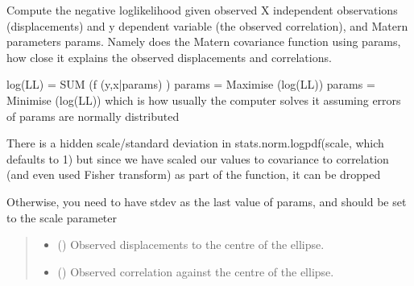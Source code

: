 \documentclass[letterpaper,10pt,english]{sphinxmanual}
\begin{document}
\begin{fulllineitems}
\begin{fulllineitems}
\end{fulllineitems}


\begin{fulllineitems}
\label{\detokenize{ellipse:glomar_gridding.ellipse.EllipseModel.negative_log_likelihood}}
\pysigstartsignatures
\pysiglinewithargsret
{}
{\sphinxparamcomma {}\sphinxparamcomma {}\sphinxparamcomma {}}
{}
\pysigstopsignatures
\sphinxAtStartPar
Compute the negative log\sphinxhyphen{}likelihood given observed X independent
observations (displacements) and y dependent variable (the observed
correlation), and Matern parameters params. Namely does the Matern
covariance function using params, how close it explains the observed
displacements and correlations.

\sphinxAtStartPar
log(LL) = SUM (f (y,x|params) )
params = Maximise (log(LL))
params = Minimise (\sphinxhyphen{}log(LL)) which is how usually the computer solves it
assuming errors of params are normally distributed

\sphinxAtStartPar
There is a hidden scale/standard deviation in
stats.norm.logpdf(scale, which defaults to 1)
but since we have scaled our values to covariance to correlation (and
even used Fisher transform) as part of the function, it can be dropped

\sphinxAtStartPar
Otherwise, you need to have stdev as the last value of params, and
should be set to the scale parameter
\begin{quote}\begin{description}
\begin{itemize}
\item {}
\sphinxAtStartPar
{} () \textendash{} Observed displacements to the centre of the ellipse.

\item {}
\sphinxAtStartPar
{} () \textendash{} Observed correlation against the centre of the ellipse.


\end{itemize}
\end{description}
\end{quote}
\end{fulllineitems}
\end{fulllineitems}
\end{document}
